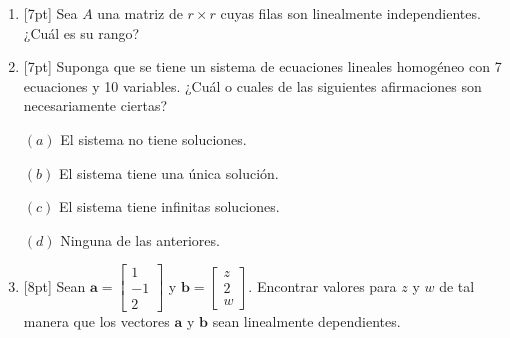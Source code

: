 \documentclass[11pt]{article}
\begin{document}
\begin{enumerate}
\item{}[7pt] Sea $A$ una matriz de $r\times r$ cuyas filas son linealmente independientes. ¿Cuál es su rango?

\vspace{4pt}

\item{}[7pt] Suponga que se tiene un sistema de ecuaciones lineales homogéneo con 7 ecuaciones y 10 variables. ¿Cuál o cuales de las siguientes afirmaciones son necesariamente ciertas?

\vspace{6pt}
\noindent
\begin{minipage}[t]{0.5\linewidth}
$(a)$ El sistema no tiene soluciones.
\end{minipage}%
\begin{minipage}[t]{0.46\linewidth}
$(b)$ El sistema tiene una única solución.
\end{minipage}

\vspace{4pt}
\noindent
\begin{minipage}[t]{0.5\linewidth}
$(c)$ El sistema tiene infinitas soluciones.
\end{minipage}%
\begin{minipage}[t]{0.46\linewidth}
$(d)$ Ninguna de las anteriores.
\end{minipage}

\item{}[8pt] Sean $\mathbf{a} = \begin{bmatrix}1\\-1\\2\end{bmatrix}$ y $\mathbf{b} = \begin{bmatrix}z\\2\\w\end{bmatrix}$. Encontrar valores para $z$ y $w$ de tal manera que los vectores $\mathbf{a}$ y $\mathbf{b}$ sean linealmente dependientes.

\vspace{4pt}
\end{enumerate}
\end{document}
